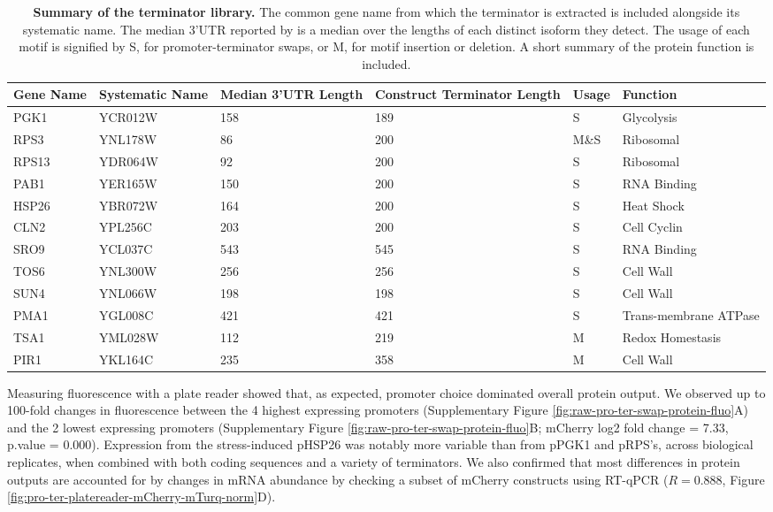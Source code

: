 \documentclass[../main.tex]{subfiles}
\begin{document}
\begin{table}
    \def\arraystretch{1.25}
    \setlength{\tabcolsep}{5pt}
\centering
\fontsize{9}{9}\selectfont
\begin{tabular}{
  | m{4em} | m{5em} | m{5em} | m{5em} | m{3em} | m{6em} | }
\hline
\textbf{Gene Name} & \textbf{Systematic Name} & \textbf{Median 3’UTR Length} & \textbf{Construct Terminator Length} & \textbf{Usage}&  \textbf{Function}\\
\hline
PGK1 & YCR012W & 158 & 189 & S & Glycolysis\\
\hline
RPS3 & YNL178W & 86 & 200 & M\&S & Ribosomal\\
\hline
RPS13 & YDR064W & 92 & 200 & S & Ribosomal\\
\hline
PAB1 & YER165W & 150 & 200 & S & RNA Binding\\
\hline
HSP26 & YBR072W & 164 & 200 & S & Heat Shock\\
\hline
CLN2 & YPL256C & 203 & 200 & S & Cell Cyclin\\
\hline
SRO9 & YCL037C & 543 & 545 & S & RNA Binding\\
\hline
TOS6 & YNL300W & 256 & 256 & S & Cell Wall\\
\hline
SUN4 & YNL066W & 198 & 198 & S & Cell Wall\\
\hline
PMA1 & YGL008C & 421 & 421 & S & Trans-membrane ATPase\\
\hline
TSA1 & YML028W & 112 & 219 & M & Redox Homestasis\\
\hline
PIR1 & YKL164C & 235 & 358 & M & Cell Wall\\
\hline
\end{tabular}
\caption[Summary of the terminator library.]{\label{tab:terminator-summary-table}\textbf{Summary of the terminator library.} The common gene name from which the terminator is extracted is included alongside its systematic name. The median 3'UTR reported by \parencite{Pelechano2013} is a median over the lengths of each distinct isoform they detect. The usage of each motif is signified by S, for promoter-terminator swaps, or M, for motif insertion or deletion. A short summary of the protein function is included.}
\end{table}

Measuring fluorescence with a plate reader showed that, as expected, promoter choice dominated overall protein output.
We observed up to 100-fold changes in fluorescence between the 4 highest expressing promoters (Supplementary Figure \ref{fig:raw-pro-ter-swap-protein-fluo}A) and the 2 lowest expressing promoters (Supplementary Figure \ref{fig:raw-pro-ter-swap-protein-fluo}B; mCherry log2 fold change = 7.33, p.value = 0.000).
Expression from the stress-induced pHSP26 was notably more variable than from pPGK1 and pRPS's, across biological replicates, when combined with both coding sequences and a variety of terminators.
We also confirmed that most differences in protein outputs are accounted for by changes in mRNA abundance by checking a subset of mCherry constructs using RT-qPCR (\(R = 0.888\), Figure \ref{fig:pro-ter-platereader-mCherry-mTurq-norm}D).
\end{document}
